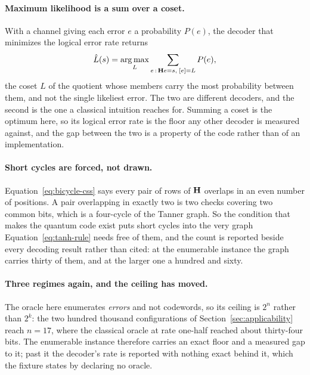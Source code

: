 \documentclass[11pt,a4paper]{article}
\begin{document}
\paragraph{Maximum likelihood is a sum over a coset.}
With a channel giving each error $e$ a probability $P(e)$, the decoder that
minimizes the logical error rate returns
\begin{equation}
  \hat L(s) = \operatorname*{arg\,max}_{L}
    \sum_{e \,:\, \mathbf{H} e = s,\; [e] = L} P(e),
  \label{eq:coset-ml}
\end{equation}
the coset $L$ of the quotient whose members carry the most probability between
them, and not the single likeliest error. The two are different decoders, and
the second is the one a classical intuition reaches for. Summing a coset is the
optimum here, so its logical error rate is the floor any other decoder is
measured against, and the gap between the two is a property of the code rather
than of an implementation.

\paragraph{Short cycles are forced, not drawn.}
Equation~\ref{eq:bicycle-css} says every pair of rows of $\mathbf{H}$ overlaps in
an even number of positions. A pair overlapping in exactly two is two checks
covering two common bits, which is a four-cycle of the Tanner graph. So the
condition that makes the quantum code exist puts short cycles into the very
graph Equation~\ref{eq:tanh-rule} needs free of them, and the count is reported
beside every decoding result rather than cited: at the enumerable instance the
graph carries thirty of them, and at the larger one a hundred and sixty.

\paragraph{Three regimes again, and the ceiling has moved.}
The oracle here enumerates \emph{errors} and not codewords, so its ceiling is
$2^n$ rather than $2^k$: the two hundred thousand configurations of
Section~\ref{sec:applicability} reach $n = 17$, where the classical oracle at
rate one-half reached about thirty-four bits. The enumerable instance therefore
carries an exact floor and a measured gap to it; past it the decoder's rate is
reported with nothing exact behind it, which the fixture states by declaring no
oracle.
\end{document}
